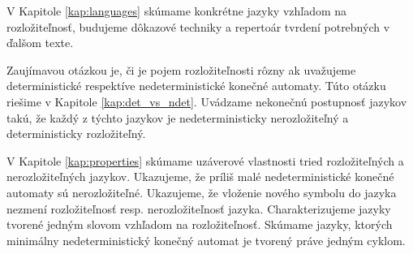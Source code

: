 V Kapitole \ref{kap:languages} skúmame konkrétne jazyky vzhľadom na rozložiteľnosť, budujeme dôkazové techniky a repertoár tvrdení potrebných v ďalšom texte.
\par
Zaujímavou otázkou je, či je pojem rozložiteľnosti rôzny ak uvažujeme deterministické respektíve nedeterministické konečné automaty. Túto otázku riešime v Kapitole \ref{kap:det_vs_ndet}. Uvádzame nekonečnú postupnosť jazykov takú, že každý z týchto jazykov je nedeterministicky nerozložiteľný a deterministicky rozložiteľný.
\par
V Kapitole \ref{kap:properties} skúmame uzáverové vlastnosti tried rozložiteľných a nerozložiteľných jazykov. Ukazujeme, že príliš malé nedeterministické konečné automaty sú nerozložiteľné. Ukazujeme, že vloženie nového symbolu do jazyka nezmení rozložiteľnosť resp. nerozložiteľnosť jazyka. Charakterizujeme jazyky tvorené jedným slovom vzhľadom na rozložiteľnosť. Skúmame jazyky, ktorých minimálny nedeterministický konečný automat je tvorený práve jedným cyklom.